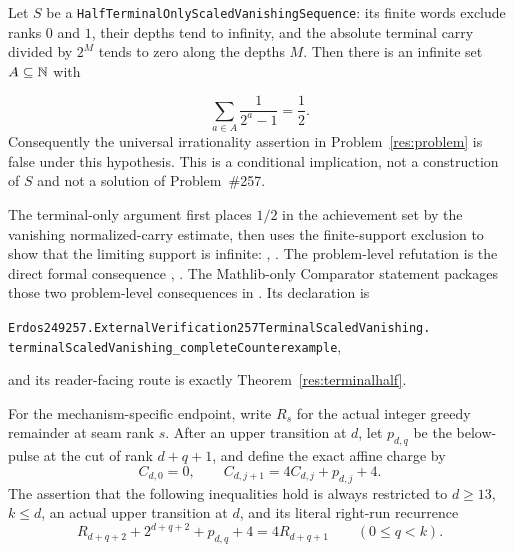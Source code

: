 \documentclass[11pt]{article}
\begin{document}
\begin{theorem}
\label{res:terminalhalf}
Let $S$ be a
\texttt{HalfTerminalOnlyScaledVanishingSequence}: its finite words exclude
ranks $0$ and $1$, their depths tend to infinity, and the absolute terminal
carry divided by $2^M$ tends to zero along the depths $M$.  Then there is an
infinite set $A\subseteq\mathbb{N}$ with

\[
  \sum_{a\in A}\frac1{2^a-1}=\frac12.
\]
Consequently the universal irrationality assertion in
Problem~\ref{res:problem} is false under this hypothesis.  This is a
conditional implication, not a construction of $S$ and not a solution
of Problem~\#257.
\end{theorem}

\noindent The terminal-only argument first places $1/2$ in the achievement
set by the vanishing normalized-carry estimate, then uses the finite-support
exclusion to show that the limiting support is infinite:
,
.
The problem-level refutation is the direct formal consequence
,
.
The Mathlib-only Comparator statement packages those two problem-level
consequences in
.
Its declaration is
\begin{center}
\small
\texttt{Erdos249257.ExternalVerification257TerminalScaledVanishing.}\allowbreak
\texttt{terminalScaledVanishing\_completeCounterexample},
\end{center}
and its reader-facing route is exactly Theorem~\ref{res:terminalhalf}.

For the mechanism-specific endpoint, write
\(R_s\) for the actual integer greedy remainder at seam rank \(s\).  After an
upper transition at \(d\), let \(p_{d,q}\) be the below-pulse at the cut of
rank \(d+q+1\), and define the exact affine charge by
\[
  C_{d,0}=0,\qquad
  C_{d,j+1}=4C_{d,j}+p_{d,j}+4.
\]
The assertion that the following inequalities hold is always restricted to
\(d\ge13\), \(k\le d\), an actual upper transition at \(d\), and its literal
right-run recurrence
\[
 R_{d+q+2}+2^{d+q+2}+p_{d,q}+4=4R_{d+q+1}
 \qquad(0\le q<k).
\]
\end{document}
